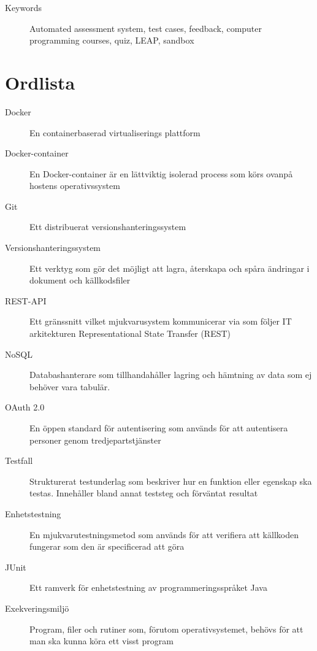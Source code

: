 \documentclass[a4paper,11pt]{article}
\begin{document}
{\begin{description}
    \item[Keywords] Automated assessment system, test cases, feedback, computer programming courses, quiz, LEAP, sandbox
\end{description}

\newpage

\section*{Ordlista}
\begin{description}
    \item [Docker] En containerbaserad virtualiserings plattform
    \item [Docker-container] En Docker-container är en lättviktig isolerad process som körs ovanpå hostens operativssystem
    \item [Git] Ett distribuerat versionshanteringssystem
    \item [Versionshanteringssystem] Ett verktyg som gör det möjligt att lagra, återskapa och spåra ändringar i dokument och källkodsfiler
    \item [REST-API] Ett gränssnitt vilket mjukvarusystem kommunicerar via som följer IT arkitekturen Representational State Transfer (REST)
    \item [NoSQL] Databashanterare som tillhandahåller lagring och hämtning av data som ej behöver vara tabulär.
    \item [OAuth 2.0] En öppen standard för autentisering som används för att autentisera personer genom tredjepartstjänster
    \item [Testfall] Strukturerat testunderlag som beskriver hur en funktion eller egenskap ska testas. Innehåller bland annat teststeg och förväntat resultat
    \item [Enhetstestning] En mjukvarutestningsmetod som används för att verifiera att källkoden fungerar som den är specificerad att göra
    \item [JUnit] Ett ramverk för enhetstestning av programmeringsspråket Java
    \item [Exekveringsmiljö] Program, filer och rutiner som, förutom operativsystemet, behövs för att man ska kunna köra ett visst program
\end{description}


\newpage

\mbox{}

\newpage
\tableofcontents
\newpage
\ifodd\value{page}\else\mbox{}\newpage\fi
\setcounter{page}{1}
\renewcommand{\thepage}{\rempage}

}
\end{document}
